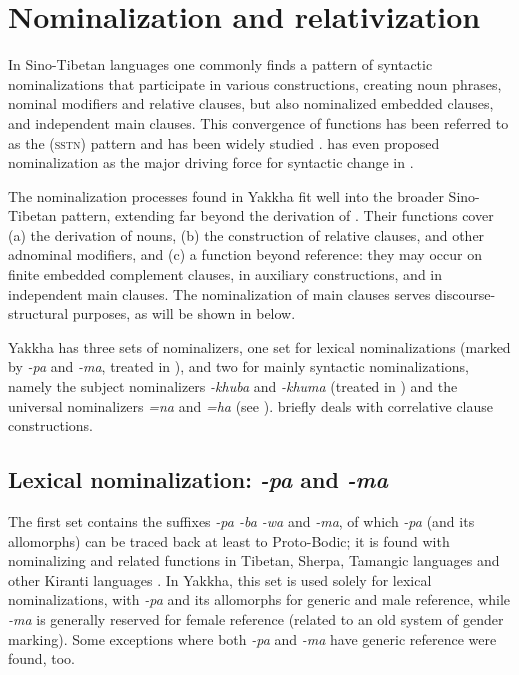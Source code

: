 
\chapter{Nominalization and relativization}\label{ch-nmlz}

In Sino-Tibetan languages one commonly finds a pattern of syntactic nominalizations that participate in various constructions, creating noun phrases, nominal modifiers and relative clauses, but also nominalized embedded clauses,  and independent main clauses. This convergence of functions has been referred to as the  (\textsc{sstn}) pattern \citep[271]{Bickel1999Nominalization} and has been widely studied \citep{Matisoff1972Lahu, DeLancey1989Relativization, Genetti1992Semantic,  Genettietal2008_Nominalization, Saxena1992_Finite, Ebert1994The-structure, DeLancey1999Relativization, Bickel1999Nominalization, Watters2002A-grammar, Noonan2008_Nominalization, Doornenbal2008_Nominalization}. \citet{DeLancey2011_Finite} has even proposed nominalization as the major driving force for syntactic change in . 
 
The nominalization processes found in Yakkha fit well into the broader Sino-Tibetan pattern, extending far beyond the derivation of . Their functions cover (a) the derivation of nouns, (b) the construction of relative clauses,  and other adnominal modifiers, and (c) a function beyond  reference: they may occur on finite embedded complement clauses, in auxiliary constructions, and  in independent main clauses. The nominalization of  main clauses serves discourse-structural purposes, as will be shown in  below.

Yakkha has three sets of nominalizers, one set for lexical nominalizations (marked by \emph{-pa} and \emph{-ma}, treated in ), and two for mainly syntactic nominalizations, namely the subject nominalizers \emph{-khuba} and \emph{-khuma} (treated in ) and the universal nominalizers \emph{=na} and \emph{=ha} (see ).  briefly  deals with correlative clause constructions.


\section{Lexical nominalization: \emph{-pa} and \emph{-ma}}\label{nmlz-pa}
\largerpage
The first set contains the  suffixes \emph{-pa \ti -ba \ti -wa} and \emph{-ma}, of which \emph{-pa} (and its allomorphs) can be traced back at least to Proto-Bodic; it is found with nominalizing and related functions in Tibetan,  Sherpa,  Tamangic languages and other Kiranti languages \citep{DeLancey2002_Relativization, DeLancey2011_Finite, Genetti1992Semantic}. In Yakkha, this set is used solely for lexical nominalizations, with \emph{-pa} and its allomorphs for generic and male reference, while \emph{-ma} is generally reserved for female reference (related to an old system of gender marking). Some exceptions where both \emph{-pa} and \emph{-ma} have generic reference were found, too. 

